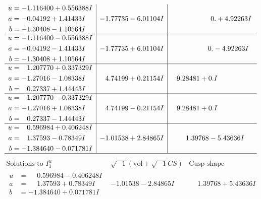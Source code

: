 \documentclass[1p]{elsarticle_modified}
\theoremstyle{definition}
\newcommand{\I}{\sqrt{-1}}
\begin{document}
$$\begin{array}{c|c|c}
\begin{aligned}
u &= -1.116400 + 0.556388 I \\
a &= -0.04192 + 1.41433 I \\
b &= -1.30408 - 1.10564 I\end{aligned}
 & -1.77735 - 6.01104 I & \phantom{-0.000000 -}0. + 4.92263 I \\ \hline\begin{aligned}
u &= -1.116400 - 0.556388 I \\
a &= -0.04192 - 1.41433 I \\
b &= -1.30408 + 1.10564 I\end{aligned}
 & -1.77735 + 6.01104 I & \phantom{-0.000000 } 0. - 4.92263 I \\ \hline\begin{aligned}
u &= \phantom{-}1.207770 + 0.337329 I \\
a &= -1.27016 - 1.08338 I \\
b &= \phantom{-}0.27337 + 1.44443 I\end{aligned}
 & \phantom{-}4.74199 + 0.21154 I & \phantom{-}9.28481 + 0. I\phantom{ +0.000000I} \\ \hline\begin{aligned}
u &= \phantom{-}1.207770 - 0.337329 I \\
a &= -1.27016 + 1.08338 I \\
b &= \phantom{-}0.27337 - 1.44443 I\end{aligned}
 & \phantom{-}4.74199 - 0.21154 I & \phantom{-}9.28481 + 0. I\phantom{ +0.000000I} \\ \hline\begin{aligned}
u &= \phantom{-}0.596984 + 0.406248 I \\
a &= \phantom{-}1.37593 - 0.78349 I \\
b &= -1.384640 - 0.071781 I\end{aligned}
 & -1.01538 + 2.84865 I & \phantom{-}1.39768 - 5.43636 I\\
 \hline 
 \end{array}$$\newpage$$\begin{array}{c|c|c}  
\text{Solutions to }I^u_{1}& \I (\text{vol} + \sqrt{-1}CS) & \text{Cusp shape}\\
 \hline 
\begin{aligned}
u &= \phantom{-}0.596984 - 0.406248 I \\
a &= \phantom{-}1.37593 + 0.78349 I \\
b &= -1.384640 + 0.071781 I\end{aligned}
 & -1.01538 - 2.84865 I & \phantom{-}1.39768 + 5.43636 I \\ \hline\begin{aligned}

\end{aligned}
\end{array}$$
\end{document}
